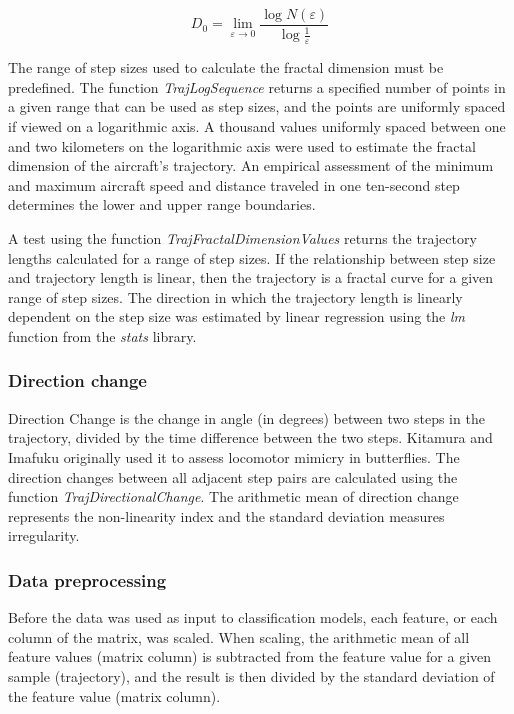 \let\LaTeXcline\cline\documentclass[sn-mathphys-num]{sn-jnl}\let\cline\LaTeXcline
\begin{document}
\begin{equation}
D_{0}=\lim_{\varepsilon \rightarrow 0} \frac{\log{N(\varepsilon)}}{\log{\frac{1}{\varepsilon}}} \label{eqn:3}
\end{equation}
  
The range of step sizes used to calculate the fractal dimension must be predefined. The function \textit{TrajLogSequence} returns a specified number of points in a given range that can be used as step sizes, and the points are uniformly spaced if viewed on a logarithmic axis. A thousand values uniformly spaced between one and two kilometers on the logarithmic axis were used to estimate the fractal dimension of the aircraft's trajectory. An empirical assessment of the minimum and maximum aircraft speed and distance traveled in one ten-second step determines the lower and upper range boundaries.

A test using the function \textit{TrajFractalDimensionValues} returns the trajectory lengths calculated for a range of step sizes. If the relationship between step size and trajectory length is linear, then the trajectory is a fractal curve for a given range of step sizes. The direction in which the trajectory length is linearly dependent on the step size was estimated by linear regression using the \textit{lm} function from the \textit{stats} library.

\subsubsection{Direction change}
 
Direction Change is the change in angle (in degrees) between two steps in the trajectory, divided by the time difference between the two steps. Kitamura and Imafuku \cite{Kitamura2015} originally used it to assess locomotor mimicry in butterflies. The direction changes between all adjacent step pairs are calculated using the function \textit{TrajDirectionalChange}. The arithmetic mean of direction change represents the non-linearity index and the standard deviation measures irregularity.

\subsubsection{Data preprocessing}

Before the data was used as input to classification models, each feature, or each column of the matrix, was scaled. When scaling, the arithmetic mean of all feature values (matrix column) is subtracted from the feature value for a given sample (trajectory), and the result is then divided by the standard deviation of the feature value (matrix column).
\end{document}
